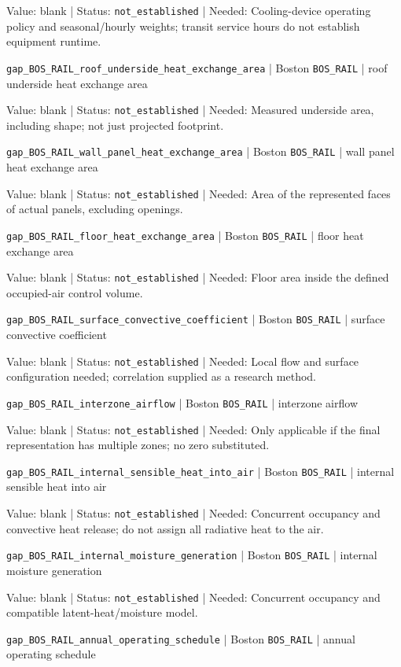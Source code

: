 Value: blank | Status: \nolinkurl{not_established} | Needed: Cooling-device operating policy and seasonal/hourly weights; transit service hours do not establish equipment runtime.

\nolinkurl{gap_BOS_RAIL_roof_underside_heat_exchange_area} | Boston \nolinkurl{BOS_RAIL}  | roof underside heat exchange area

Value: blank | Status: \nolinkurl{not_established} | Needed: Measured underside area, including shape; not just projected footprint.

\nolinkurl{gap_BOS_RAIL_wall_panel_heat_exchange_area} | Boston \nolinkurl{BOS_RAIL}  | wall panel heat exchange area

Value: blank | Status: \nolinkurl{not_established} | Needed: Area of the represented faces of actual panels, excluding openings.

\nolinkurl{gap_BOS_RAIL_floor_heat_exchange_area} | Boston \nolinkurl{BOS_RAIL}  | floor heat exchange area

Value: blank | Status: \nolinkurl{not_established} | Needed: Floor area inside the defined occupied-air control volume.

\nolinkurl{gap_BOS_RAIL_surface_convective_coefficient} | Boston \nolinkurl{BOS_RAIL}  | surface convective coefficient

Value: blank | Status: \nolinkurl{not_established} | Needed: Local flow and surface configuration needed; correlation supplied as a research method.

\nolinkurl{gap_BOS_RAIL_interzone_airflow} | Boston \nolinkurl{BOS_RAIL}  | interzone airflow

Value: blank | Status: \nolinkurl{not_established} | Needed: Only applicable if the final representation has multiple zones; no zero substituted.

\nolinkurl{gap_BOS_RAIL_internal_sensible_heat_into_air} | Boston \nolinkurl{BOS_RAIL}  | internal sensible heat into air

Value: blank | Status: \nolinkurl{not_established} | Needed: Concurrent occupancy and convective heat release; do not assign all radiative heat to the air.

\nolinkurl{gap_BOS_RAIL_internal_moisture_generation} | Boston \nolinkurl{BOS_RAIL}  | internal moisture generation

Value: blank | Status: \nolinkurl{not_established} | Needed: Concurrent occupancy and compatible latent-heat/moisture model.

\nolinkurl{gap_BOS_RAIL_annual_operating_schedule} | Boston \nolinkurl{BOS_RAIL}  | annual operating schedule

